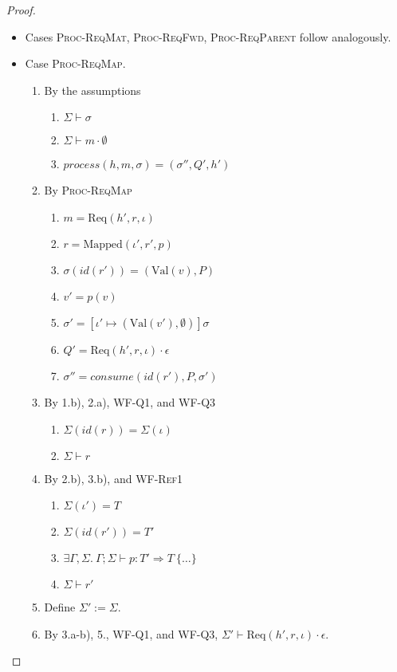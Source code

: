 \documentclass{article}
\theoremstyle{definition}
\newcommand{\Mapped}[3]{\text{Mapped}(#1, #2, #3)}
\newcommand{\Req}[3]{\text{Req}(#1, #2, #3)}
\newcommand{\Val}[1]{\text{Val}(#1)}
\begin{document}
\begin{proof}
\begin{itemize}
\item Cases \textsc{Proc-ReqMat}, \textsc{Proc-ReqFwd}, \textsc{Proc-ReqParent} follow analogously.

\item Case \textsc{Proc-ReqMap}.
\begin{enumerate}
\item By the assumptions
  \begin{enumerate}[label=(\alph*)]
  \item $\Sigma \vdash \sigma$
  \item $\Sigma \vdash m \cdot \emptyset$
  \item $process(h, m, \sigma) = (\sigma'', Q', h')$
  \end{enumerate}
\item By \textsc{Proc-ReqMap}
  \begin{enumerate}[label=(\alph*)]
  \item $m = {\Req {h'} r \iota}$
  \item $r = {\Mapped {\iota'} {r'} p}$
  \item $\sigma(id(r')) = ({\Val v}, P)$
  \item $v' = p(v)$
  \item $\sigma' = [\iota' \mapsto ({\Val {v'}}, \emptyset)]\sigma$
  \item $Q' = {\Req {h'} r \iota} \cdot \epsilon$
  \item $\sigma'' = consume(id(r'), P, \sigma')$
  \end{enumerate}
\item By 1.b), 2.a), \textsc{WF-Q1}, and \textsc{WF-Q3}
  \begin{enumerate}[label=(\alph*)]
  \item $\Sigma(id(r)) = \Sigma(\iota)$
  \item $\Sigma \vdash r$
  \end{enumerate}
\item By 2.b), 3.b), and \textsc{WF-Ref1}
  \begin{enumerate}[label=(\alph*)]
  \item $\Sigma(\iota') = T$
  \item $\Sigma(id(r')) = T'$
  \item $\exists \Gamma, \Sigma.~\Gamma ; \Sigma \vdash p : T' \Rightarrow T~\{\ldots\}$
  \item $\Sigma \vdash r'$
  \end{enumerate}
\item Define $\Sigma' := \Sigma$.
\item By 3.a-b), 5., \textsc{WF-Q1}, and \textsc{WF-Q3}, $\Sigma' \vdash {\Req {h'} r \iota} \cdot \epsilon$.

\end{enumerate}
\end{itemize}
\end{proof}
\end{document}

